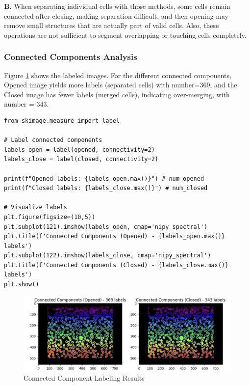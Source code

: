 \documentclass[12pt]{article}
\begin{document}
\textbf{B. } When separating individual cells with those methods, some cells remain connected after closing, making separation difficult, and then opening may remove small structures that are actually part of valid cells. Also, these operations are not sufficient to segment overlapping or touching cells completely.

\subsubsection{Connected Components Analysis} %

Figure \ref{fig:connected_components} shows the labeled images. For the different connected components, Opened image yields more labels (separated cells) with number=369, and the Closed image has fewer labels (merged cells), indicating over-merging, with number = 343.


\begin{lstlisting}
from skimage.measure import label

# Label connected components
labels_open = label(opened, connectivity=2)
labels_close = label(closed, connectivity=2)

print(f"Opened labels: {labels_open.max()}") # num_opened
print(f"Closed labels: {labels_close.max()}") # num_closed

# Visualize labels
plt.figure(figsize=(10,5))
plt.subplot(121).imshow(labels_open, cmap='nipy_spectral')
plt.title(f'Connected Components (Opened) - {labels_open.max()} labels')
plt.subplot(122).imshow(labels_close, cmap='nipy_spectral')
plt.title(f'Connected Components (Closed) - {labels_close.max()} labels')
plt.show()
\end{lstlisting}


\begin{figure}[ht]
    \centering
        \includegraphics[width=\textwidth]{pics/a7-4.1.3}
    \caption{Connected Component Labeling Results}
    \label{fig:connected_components}
\end{figure}
\end{document}
